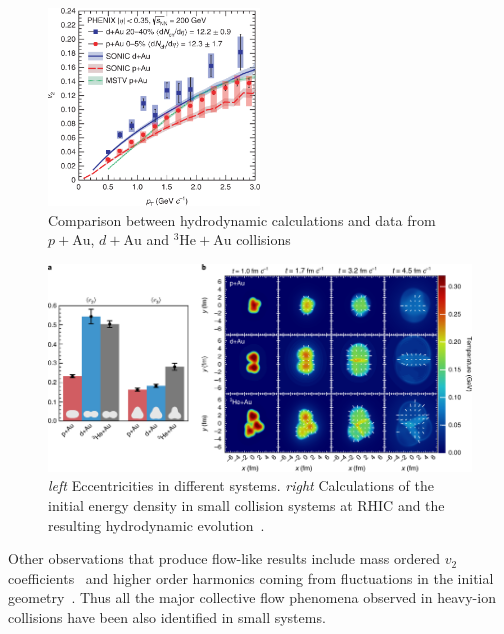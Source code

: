 \begin{figure}[htb]
\centering

		\includegraphics[width=0.5\textwidth]{figures/41567_2018_360_Fig4_HTML.png}
                \caption{Comparison between hydrodynamic calculations and data from $p+\mathrm{Au}$, $d+\mathrm{Au}$ and $^3\mathrm{He+Au}$ collisions~\cite{PHENIX:2018lia}}
	\label{fig:smallsystems1}
\end{figure}

\begin{figure}[b!]
\centering
            	\includegraphics[width=\textwidth]{figures/PhenixNature_1.png}
	\caption{{\it left} Eccentricities in different systems. {\it right} Calculations of the initial energy density in small collision systems at RHIC and the resulting hydrodynamic evolution~\cite{PHENIX:2018lia}.}
	\label{fig:smallhydro}
	\end{figure}



Other observations that produce flow-like results include mass ordered $v_2$ coefficients~\cite{} and higher order harmonics coming from fluctuations in the initial geometry~\cite{Acharya:2017ino}. Thus all the major collective flow phenomena observed in heavy-ion collisions have been also identified in small systems.

